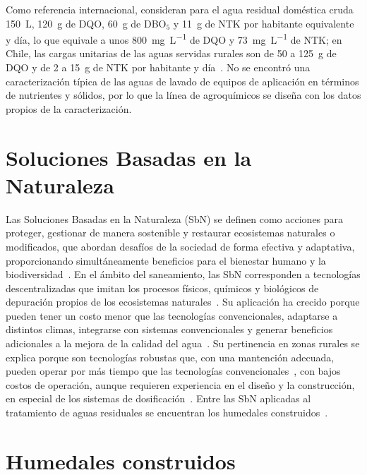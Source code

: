 Como referencia internacional, \textcite{dotro2021humedales} consideran para el agua residual doméstica cruda 150~L, 120~g de DQO, 60~g de DBO$_5$ y 11~g de NTK por habitante equivalente y día, lo que equivale a unos \qty{800}{\milli\gram\per\liter} de DQO y \qty{73}{\milli\gram\per\liter} de NTK; en Chile, las cargas unitarias de las aguas servidas rurales son de 50 a 125~g de DQO y de 2 a 15~g de NTK por habitante y día~\parencite{araya2014aguas}.
No se encontró una caracterización típica de las aguas de lavado de equipos de aplicación en términos de nutrientes y sólidos, por lo que la línea de agroquímicos se diseña con los datos propios de la caracterización.

\section{Soluciones Basadas en la Naturaleza}
\label{sec:mt-sbn}

Las Soluciones Basadas en la Naturaleza (SbN) se definen como acciones para proteger, gestionar de manera sostenible y restaurar ecosistemas naturales o modificados, que abordan desafíos de la sociedad de forma efectiva y adaptativa, proporcionando simultáneamente beneficios para el bienestar humano y la biodiversidad~\parencite{cohenshacham2016nature}.
En el ámbito del saneamiento, las SbN corresponden a tecnologías descentralizadas que imitan los procesos físicos, químicos y biológicos de depuración propios de los ecosistemas naturales~\parencite{dotro2021humedales,cross2021nature}.
Su aplicación ha crecido porque pueden tener un costo menor que las tecnologías convencionales, adaptarse a distintos climas, integrarse con sistemas convencionales y generar beneficios adicionales a la mejora de la calidad del agua~\parencite{cross2021nature}.
Su pertinencia en zonas rurales se explica porque son tecnologías robustas que, con una mantención adecuada, pueden operar por más tiempo que las tecnologías convencionales~\parencite{rodriguezdominguez2020constructed}, con bajos costos de operación, aunque requieren experiencia en el diseño y la construcción, en especial de los sistemas de dosificación~\parencite{reuter2022compendio}.
Entre las SbN aplicadas al tratamiento de aguas residuales se encuentran los humedales construidos~\parencite{cross2021nature}.

\section{Humedales construidos}
\label{sec:mt-humedales}

